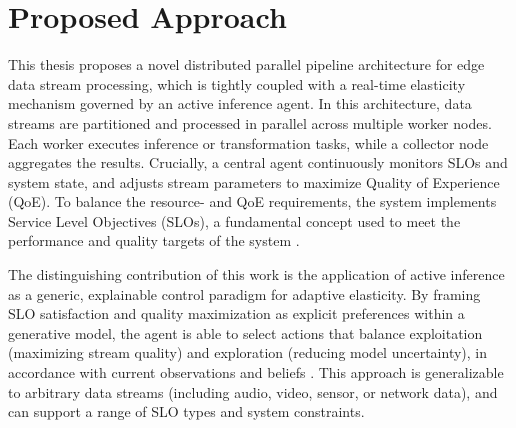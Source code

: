\section{Proposed Approach}
This thesis proposes a novel distributed parallel pipeline architecture for edge data stream processing, which is tightly coupled with a real-time elasticity mechanism governed by an active inference agent. In this architecture, data streams are partitioned and processed in parallel across multiple worker nodes. Each worker executes inference or transformation tasks, while a collector node aggregates the results. Crucially, a central agent continuously monitors SLOs and system state, and adjusts stream parameters to maximize Quality of Experience (QoE). To balance the resource- and QoE requirements, the system implements Service Level Objectives (SLOs), a fundamental concept used to meet the performance and quality targets of the system \cite{sedlak_towards_2025, nastic_sloc_2020}.

The distinguishing contribution of this work is the application of active inference as a generic,
explainable control paradigm for adaptive elasticity. By framing SLO satisfaction and quality maximization as explicit preferences within a generative model, the agent is able to select actions that balance exploitation (maximizing stream quality) and exploration (reducing model uncertainty), in accordance with current observations and beliefs \cite{casamayor_pujol_deepslos_2024, sedlak_adaptive_2024, danilenka_adaptive_2025, lanillos_active_2021}. This approach is generalizable to arbitrary data streams (including audio, video, sensor, or network data), and can support a range of SLO types and system constraints.

